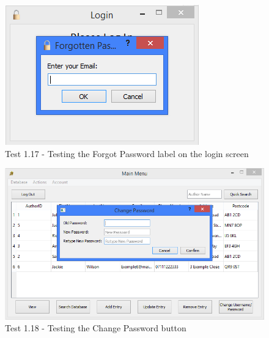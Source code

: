 \begin{landscape}
\begin{figure}[H]
    \includegraphics[width=\textwidth]{./Testing/Evidence/ForgotPasswordLabelTest.png}
    \caption{Test 1.17  - Testing the Forgot Password label on the login screen}  \label{fig:ForgotPasswordLabelTest}
\end{figure}

\begin{figure}[H]
    \includegraphics[width=\textwidth]{./Testing/Evidence/ChangePasswordButtonTest.png}
    \caption{Test 1.18 - Testing the Change Password button}  \label{fig:ChangePasswordButtonTest}
\end{figure}


\end{landscape}
